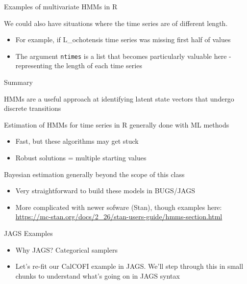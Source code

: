 \documentclass[
  ignorenonframetext,
]{beamer}
\providecommand{\tightlist}{%
  \setlength{\itemsep}{0pt}\setlength{\parskip}{0pt}}
\begin{document}
\begin{frame}[fragile]{Examples of multivariate HMMs in R}
\protect\hypertarget{examples-of-multivariate-hmms-in-r-4}{}

We could also have situations where the time series are of different
length.

\begin{itemize}
\item
  For example, if L\_ochotensis time series was missing first half of
  values
\item
  The argument \texttt{ntimes} is a list that becomes particularly
  valuable here - representing the length of each time series
\end{itemize}

\end{frame}

\begin{frame}{Summary}
\protect\hypertarget{summary}{}

HMMs are a useful approach at identifying latent state vectors that
undergo discrete transitions

Estimation of HMMs for time series in R generally done with ML methods

\begin{itemize}
\tightlist
\item
  Fast, but these algorithms may get stuck
\item
  Robust solutions = multiple starting values
\end{itemize}

Bayesian estimation generally beyond the scope of this class

\begin{itemize}
\tightlist
\item
  Very straightforward to build these models in BUGS/JAGS
\item
  More complicated with newer sofware (Stan), though examples here:
  \url{https://mc-stan.org/docs/2_26/stan-users-guide/hmms-section.html}
\end{itemize}

\end{frame}

\begin{frame}{JAGS Examples}
\protect\hypertarget{jags-examples}{}

\begin{itemize}
\item
  Why JAGS? Categorical samplers
\item
  Let's re-fit our CalCOFI example in JAGS. We'll step through this in
  small chunks to understand what's going on in JAGS syntax
\end{itemize}

\end{frame}
\end{document}
